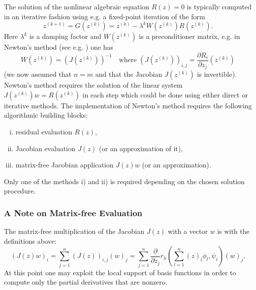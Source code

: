 \documentclass[a4paper,12pt]{article}
\begin{document}
The solution of the nonlinear algebraic equation $R(z)=0$ is typically computed
in an iterative fashion using e.g. a fixed-point iteration of the form
\begin{equation}
z^{(k+1)} = G(z^{(k)}) = z^{(k)} - \lambda^{k} W(z^{(k)}) R(z^{(k)}) .
\end{equation}
Here $\lambda^{k}$ is a damping factor
and $W(z^{(k)})$ is a preconditioner matrix, e.g. in Newton's method (see e.g. \cite{Braess}) one
has 
\begin{equation*}
W(z^{(k)}) = (J(z^{(k)}))^{-1} \quad \text{where $(J(z^{(k)}))_{i,j} = \frac{\partial R_i}{\partial z_j}
(z^{(k)})$}
\end{equation*}
(we now assumed that $n=m$ and that the Jacobian $J(z^{(k)})$ is invertible).
Newton's method requires the solution of the linear system $J(z^{(k)}) w = R(z^{(k)})$ in each
step which could be done using either direct or iterative methods.
The implementation of  Newton's method requires the following
algorithmic building blocks:
\begin{enumerate}[i)]
\item residual evaluation $R(z)$,
\item Jacobian evaluation $J(z)$ (or an approximation of it),
\item matrix-free Jacobian application $J(z) w$ (or an approximation).
\end{enumerate}
Only one of the methods i) and ii) is required depending on the chosen
solution procedure.

\subsubsection*{A Note on Matrix-free Evaluation}

The matrix-free multiplication of the Jacobian $J(z)$ with a vector $w$ is with
the definitions above:
\begin{equation*}
(J(z) w)_i = \sum_{j=1}^n (J(z))_{i,j} (w)_j = \sum_{j=1}^n 
\frac{\partial}{\partial z_j} r_h\left(\sum_{l=1}^n (z)_l  \phi_l,\psi_i\right) (w)_j .
\end{equation*}
At this point one may exploit the local support of basis functions in order
to compute only the partial derivatives that are nonzero.
\end{document}
